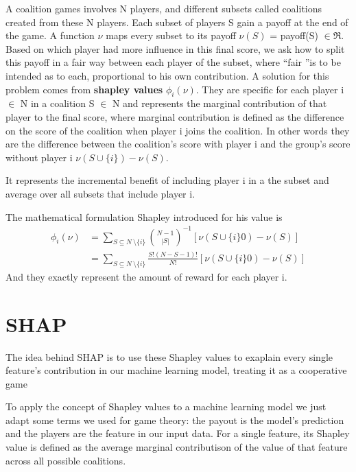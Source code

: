 \documentclass[12pt]{report}
\begin{document}
A coalition games involves N players, and different subsets called coalitions created from these N players.
Each subset of players S gain a payoff at the end of the game.
A function $\nu$ maps every subset to its payoff $\nu(S)$ = payoff(S) $\in \Re$.
Based on which player had more influence in this final score, we ask how to split this payoff in a fair way between each player of the subset, where \textquotedblleft fair \textquotedblright is to be intended as to each, proportional to his own contribution.
A solution for this problem comes from \textbf{shapley values} $\phi_i(\nu)$.
They are specific for each player i $\in$ N in a coalition S $\in$ N and represents the marginal contribution of that player to the final score, where marginal contribution is defined as the difference on the score of the coalition when player i joins the coalition.
In other words they are the difference between the coalition's score with player i and the group's score without player i $\nu (S \cup \{ i \}) - \nu(S)$.

It represents the incremental benefit of including player i in a the subset and average over all subsets that include player i.


The mathematical formulation Shapley introduced for his value is
\begin{equation}
\begin{aligned}
\phi_i(\nu)  & = \sum_{S\subseteq N\ \setminus \{ i \} }  {N- 1 \choose |S|}^{-1} [\nu (S \cup \{ i \} 0) - \nu(S)] \\
& = \sum_{S\subseteq N\ \setminus \{ i \} }  \frac{S! (N-S-1)!}{N!} [\nu (S \cup \{ i \} 0) - \nu(S) ]
\end{aligned}
\end{equation}
And they exactly represent the amount of reward for each player i.

\section{SHAP}

The idea behind SHAP is to use these Shapley values to exaplain every single feature's contribution in our machine learning model, treating it as a cooperative game

To apply the concept of Shapley values to a machine learning model we just adapt some terms we used for game theory: the payout is the model's prediction and the players are the feature in our input data.
For a single feature, its Shapley value is defined as the average marginal contributison of the value of that feature across all possible coalitions.
\end{document}
